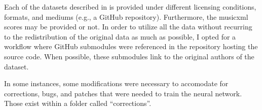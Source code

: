 
Each of the datasets described in 
is provided under different licensing conditions, formats,
and mediums (e.g., a GitHub repository). Furthermore, the
\gls{musicxml} scores may be provided or not. In order to
utilize all the data without recurring to the redistribution
of the original data as much as possible, I opted for a
workflow where GitHub submodules were referenced in the
repository hosting the source code. When possible, these
submodules link to the original authors of the dataset.

In some instances, some modifications were necessary to
accomodate for corrections, bugs, and patches that were
needed to train the neural network. Those exist within a
folder called ``corrections''.
